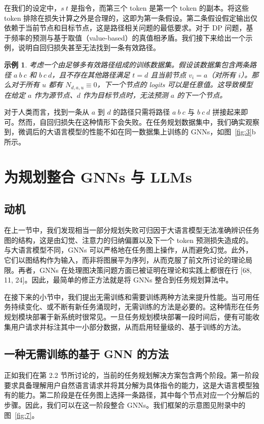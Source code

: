 \documentclass[11pt,UTF8,fontset=fandol]{ctexart}
\newtheorem{example}{示例}
\begin{document}
在我们的设定中，$s\ t$ 是指令，而第三个 token 是第一个 token 的副本。将这些 token 排除在损失计算之外是合理的，这即为第一条假设。第二条假设假定输出仅依赖于当前节点和目标节点，这是路径相关问题的最低要求。对于 DP 问题，基于频率的预测与基于取值（value-based）的真值相矛盾。我们接下来给出一个示例，说明自回归损失甚至无法找到一条有效路径。

\begin{example}
考虑一个由足够多有效路径组成的训练数据集。假设该数据集包含两条路径 $a\ b\ c$ 和 $b\ c\ d$，且不存在其他路径满足 $t = d$ 且当前节点 $v_i = a$（对所有 $i$）。那么对于所有 $u$ 都有 $N_{d,a,u} \equiv 0$，下一个节点的 logits 可以是任意值。这导致模型在给定 $a$ 作为源节点、$d$ 作为目标节点时，无法预测 $a$ 的下一个节点。
\end{example}

对于人类而言，找到一条从 $a$ 到 $d$ 的路径只需将路径 $a\ b\ c$ 与 $b\ c\ d$ 拼接起来即可。然而，自回归损失在这种情形下会失败。在任务规划数据集中，我们确实观察到，微调后的大语言模型的性能不如在同一数据集上训练的 GNNs，如图~\ref{fig:3}b 所示。

\section{为规划整合 GNNs 与 LLMs}
\subsection{动机}

在上一节中，我们发现相当一部分规划失败可归因于大语言模型无法准确辨识任务图的结构，这是由幻觉、注意力的归纳偏置以及下一个 token 预测损失造成的。与大语言模型不同，GNNs 可以严格地在任务图上操作，从而避免幻觉。此外，它们以图结构作为输入，而非将图展平为序列，从而克服了前文所讨论的理论局限。再者，GNNs 在处理图决策问题方面已被证明在理论和实践上都很在行 [68, 11, 24]。因此，最简单的修正方法就是将 GNNs 整合到任务规划算法中。

在接下来的小节中，我们提出无需训练和需要训练两种方法来提升性能。当可用任务持续变化、或不断有新任务涌现时，无需训练的方法是必要的。这种情形在任务规划模块部署于新系统时很常见。一旦任务规划模块部署一段时间后，便有可能收集用户请求并标注其中一小部分数据，从而启用轻量级的、基于训练的方法。

\subsection{一种无需训练的基于 GNN 的方法}

正如我们在第 2.2 节所讨论的，当前的任务规划解决方案包含两个阶段。第一阶段要求具备理解用户自然语言请求并将其分解为具体指令的能力，这是大语言模型独有的能力。第二阶段是在任务图上选择一条路径，其中每个节点对应一个分解后的步骤。因此，我们可以在这一阶段整合 GNNs。我们框架的示意图见附录中的图~\ref{fig:7}。
\end{document}
